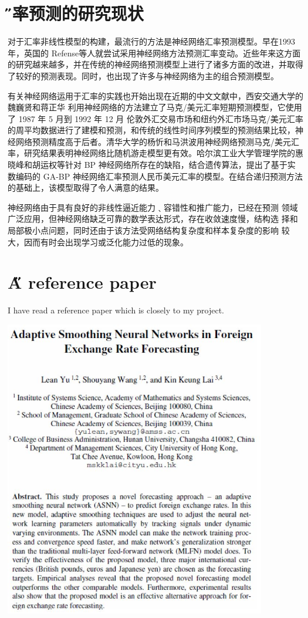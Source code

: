 \documentclass[12pt]{article}
\begin{document}
\section{\H 汇率预测的研究现状}
对于汇率非线性模型的构建，最流行的方法是神经网络汇率预测模型。早在1993 年，英国的 Refense等人就尝试采用神经网络方法预测汇率变动。近些年来这方面的研究越来越多，并在传统的神经网络预测模型上进行了诸多方面的改进，并取得了较好的预测表现。同时，也出现了许多与神经网络为主的组合预测模型。
 
有关神经网络运用于汇率的实践也开始出现在近期的中文文献中，西安交通大学的魏巍贤和蒋正华
利用神经网络的方法建立了马克/美元汇率短期预测模型，它使用了 1987 年 5 月到 1992 年 12 月 伦敦外汇交易市场和纽约外汇市场马克/美元汇率的周平均数据进行了建模和预测，和传统的线性时间序列模型的预测结果比较，神经网络预测精度高于后者。清华大学的杨忻和马洪波用神经网络预测马克/美元汇率，研究结果表明神经网络比随机游走模型更有效。哈尔滨工业大学管理学院的惠晓峰和胡运权等针对 BP 神经网络所存在的缺陷，结合遗传算法，提出了基于实数编码的 GA-BP 
神经网络汇率预测人民币美元汇率的模型。在结合递归预测方法的基础上，该模型取得了令人满意的结果。
 
神经网络由于具有良好的非线性逼近能力﹑容错性和推广能力，已经在预测
领域广泛应用，但神经网络缺乏可靠的数学表达形式，存在收敛速度慢，结构选
择和局部极小点问题，同时还由于该方法受网络结构复杂度和样本复杂度的影响
较大，因而有时会出现学习或泛化能力过低的现象。

\section{\H A reference paper}
I have read a reference paper which is closely to my project.

\includegraphics[width=4.5in]{1.jpg}
 



\end{document}
